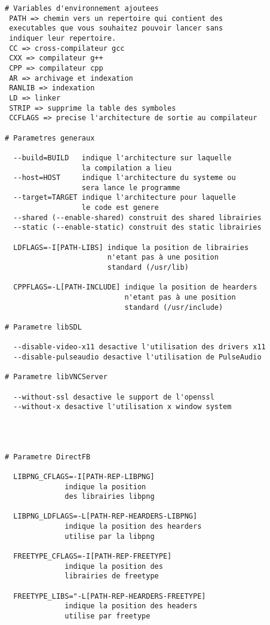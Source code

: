 \begin{lstlisting}
# Variables d'environnement ajoutees
 PATH => chemin vers un repertoire qui contient des
 executables que vous souhaitez pouvoir lancer sans
 indiquer leur repertoire.
 CC => cross-compilateur gcc
 CXX => compilateur g++
 CPP => compilateur cpp
 AR => archivage et indexation
 RANLIB => indexation
 LD => linker
 STRIP => supprime la table des symboles
 CCFLAGS => precise l'architecture de sortie au compilateur

# Parametres generaux
  
  --build=BUILD   indique l'architecture sur laquelle
                  la compilation a lieu
  --host=HOST     indique l'architecture du systeme ou
                  sera lance le programme   
  --target=TARGET indique l'architecture pour laquelle
                  le code est genere
  --shared (--enable-shared) construit des shared librairies
  --static (--enable-static) construit des static librairies
 
  LDFLAGS=-I[PATH-LIBS] indique la position de librairies
                        n'etant pas à une position
                        standard (/usr/lib)
  
  CPPFLAGS=-L[PATH-INCLUDE] indique la position de hearders
                            n'etant pas à une position
                            standard (/usr/include)
  
# Parametre libSDL

  --disable-video-x11 desactive l'utilisation des drivers x11 
  --disable-pulseaudio desactive l'utilisation de PulseAudio
  
# Parametre libVNCServer  

  --without-ssl desactive le support de l'openssl
  --without-x desactive l'utilisation x window system
  
  
  
  
# Parametre DirectFB 

  LIBPNG_CFLAGS=-I[PATH-REP-LIBPNG]
              indique la position
              des librairies libpng
  
  LIBPNG_LDFLAGS=-L[PATH-REP-HEARDERS-LIBPNG] 
              indique la position des hearders 
              utilise par la libpng
  
  FREETYPE_CFLAGS=-I[PATH-REP-FREETYPE]
              indique la position des
              librairies de freetype
 
  FREETYPE_LIBS="-L[PATH-REP-HEARDERS-FREETYPE] 
              indique la position des headers
              utilise par freetype
 

\end{lstlisting}
